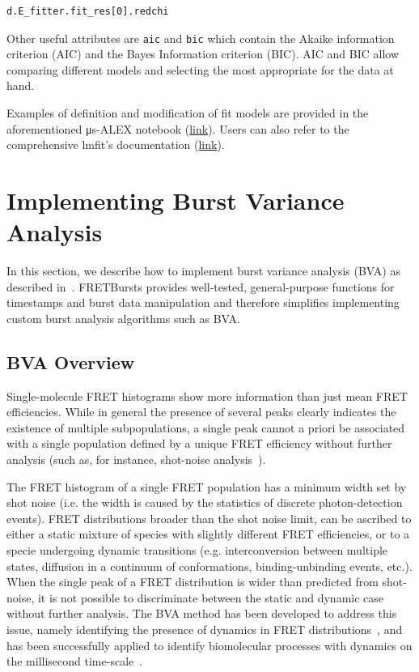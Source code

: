 \documentclass[10pt,letterpaper]{article}
\begin{document}
\begin{lstlisting}
d.E_fitter.fit_res[0].redchi
\end{lstlisting}

Other useful attributes are \verb|aic| and \verb|bic| which contain the
Akaike information criterion (AIC) and the Bayes Information criterion (BIC).
AIC and BIC allow comparing different models and
selecting the most appropriate for the data at hand.

Examples of definition and modification of fit models are provided in
the aforementioned μs-ALEX notebook
(\href{http://nbviewer.jupyter.org/github/tritemio/FRETBursts_notebooks/blob/master/notebooks/FRETBursts%20-%20us-ALEX%20smFRET%20burst%20analysis.ipynb#FRET-fit:-in-depth-example}{link}).
Users can also refer to the comprehensive lmfit's documentation
(\href{http://lmfit.github.io/lmfit-py/}{link}).


\section{Implementing Burst Variance Analysis}

\label{sec:bva}
In this section, we describe how to implement burst variance analysis (BVA) 
as described in~\cite{Torella_2011}.
FRETBursts provides well-tested, general-purpose functions for timestamps and burst data 
manipulation and therefore simplifies implementing custom burst analysis algorithms such as BVA.

\subsection{BVA Overview}
Single-molecule FRET histograms show more information than just mean FRET efficiencies. 
While in general the presence of several peaks clearly indicates the existence of 
multiple subpopulations, a single peak cannot a priori be associated with 
a single population defined by a unique FRET efficiency without further analysis 
(such as, for instance, shot-noise analysis~\cite{Nir_2006,Antonik2006}).

The FRET histogram of a single FRET population has a minimum width set by shot noise 
(i.e. the width is caused by the statistics of discrete photon-detection events). 
FRET distributions broader than the shot noise limit, 
can be ascribed to either a static mixture of species with slightly different FRET efficiencies, 
or to a specie undergoing dynamic transitions (e.g. interconversion between multiple states,
diffusion in a continuum of conformations, binding-unbinding events, etc.).
When the single peak of a FRET distribution is wider than predicted from shot-noise, 
it is not possible to discriminate between the static and dynamic case without further analysis.
The BVA method has been developed to address this issue, namely identifying the presence of dynamics 
in FRET distributions~\cite{Torella_2011}, 
and has been successfully applied to identify biomolecular processes with 
dynamics on the millisecond time-scale~\cite{Torella_2011, Robb_2013}.
\end{document}
